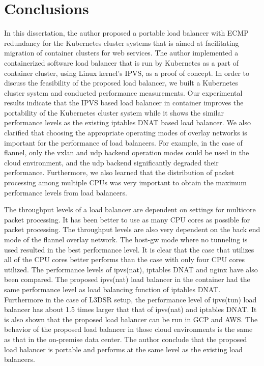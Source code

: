 \section{Conclusions}\label{Conclusions}

In this dissertation, the author proposed a portable load balancer with ECMP redundancy for the Kubernetes cluster systems that is aimed at facilitating migration of container clusters for web services.
The author implemented a containerized software load balancer that is run by Kubernetes as a part of container cluster, using Linux kernel's IPVS, as a proof of concept.
In order to discuss the feasibility of the proposed load balancer, we built 
a Kubernetes cluster system and conducted performance measurements.
Our experimental results indicate that the IPVS based load balancer in container improves the portability of 
the Kubernetes cluster system while it shows the similar performance levels as the existing iptables DNAT based load balancer.
We also clarified that choosing the appropriate operating modes of overlay networks is important for the performance of load balancers. 
For example, in the case of flannel, only the vxlan and udp backend operation modes could be used 
in the cloud environment, and the udp backend significantly degraded their performance.
Furthermore, we also learned that the distribution of packet processing among multiple CPUs was very important
to obtain the maximum performance levels from load balancers.

The throughput levels of a load balancer are dependent on settings for multicore packet processing.
It has been better to use as many CPU cores as possible for packet processing.
The throughput levels are also very dependent on the back end mode of the flannel overlay network.
The host-gw mode where no tunneling is used resulted in the best performance level.
It is clear that the case that utilizes all of the CPU cores better performs than the case with only four CPU cores utilized.
The performance levels of ipvs(nat), iptables DNAT and nginx have also been compared.
The proposed ipvs(nat) load balancer in the container had the same performance level as load balancing function of iptables DNAT.
Furthermore in the case of L3DSR setup, the performance level of ipvs(tun) load balancer has about 1.5 times larger that that of ipvs(nat) and iptables DNAT.
It is also shown that the proposed load balancer can be run in GCP and AWS.
The behavior of the proposed load balancer in those cloud environments is the same as that in the on-premise data center.
The author conclude that the proposed load balancer is portable and performs at the same level as the existing load balancers.



